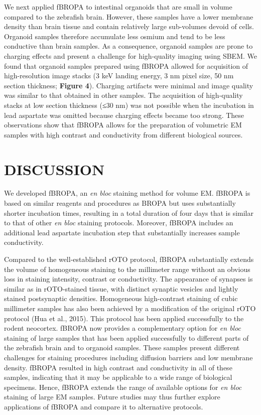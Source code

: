 \documentclass{article}
\begin{document}
We next applied fBROPA to intestinal organoids that are small in volume compared to the zebrafish brain. However, these samples have a lower membrane density than brain tissue and contain relatively large sub-volumes devoid of cells. Organoid samples therefore accumulate less osmium and tend to be less conductive than brain samples. As a consequence, organoid samples are prone to charging effects and present a challenge for high-quality imaging using SBEM. We found that organoid samples prepared using fBROPA allowed for acquisition of high-resolution image stacks (3 keV landing energy, 3 nm pixel size, 50 nm section thickness; \textbf{Figure 4}). Charging artifacts were minimal and image quality was similar to that obtained in other samples. The acquisition of high-quality stacks at low section thickness (≤30 nm) was not possible when the incubation in lead aspartate was omitted because charging effects became too strong. These observations show that fBROPA allows for the preparation of volumetric EM samples with high contrast and conductivity from different biological sources.

\section*{DISCUSSION}

We developed fBROPA, an \emph{en bloc} staining method for volume EM. fBROPA is based on similar reagents and procedures as BROPA but uses substantially shorter incubation times, resulting in a total duration of four days that is similar to that of other \emph{en bloc} staining protocols. Moreover, fBROPA includes an additional lead aspartate incubation step that substantially increases sample conductivity.

Compared to the well-established rOTO protocol, fBROPA substantially extends the volume of homogeneous staining to the millimeter range without an obvious loss in staining intensity, contrast or conductivity. The appearance of synapses is similar as in rOTO-stained tissue, with distinct synaptic vesicles and lightly stained postsynaptic densities. Homogeneous high-contrast staining of cubic millimeter samples has also been achieved by a modification of the original rOTO protocol (Hua et al., 2015). This protocol has been applied successfully to the rodent neocortex. fBROPA now provides a complementary option for \emph{en bloc} staining of large samples that has been applied successfully to different parts of the zebrafish brain and to organoid samples. These samples present different challenges for staining procedures including diffusion barriers and low membrane density. fBROPA resulted in high contrast and conductivity in all of these samples, indicating that it may be applicable to a wide range of biological specimens. Hence, fBROPA extends the range of available options for \emph{en bloc} staining of large EM samples. Future studies may thus further explore applications of fBROPA and compare it to alternative protocols.
\end{document}
